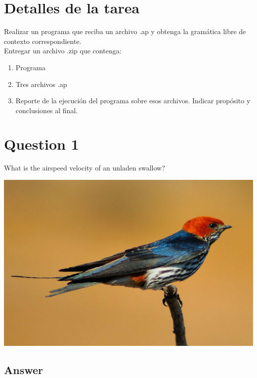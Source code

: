 \documentclass[
	12pt, %
	spanish, %
]{fphw}
\begin{document}
\section*{Detalles de la tarea }
Realizar un programa que reciba un archivo .ap y obtenga la gramática libre de contexto correspondiente.\\
Entregar un archivo .zip que contenga:
\begin{enumerate}[label=\arabic*)]
    \item Programa
    \item Tres archivos .ap
    \item Reporte de la ejecución del programa sobre esos archivos. Indicar propósito y conclusiones al final.
\end{enumerate}

\section*{Question 1}

\begin{problem}
	What is the airspeed velocity of an unladen swallow?
\end{problem}
\begin{center}
	\includegraphics[width=0.5\columnwidth]{swallow.jpg} %
\end{center}


\subsection*{Answer}
\end{document}
